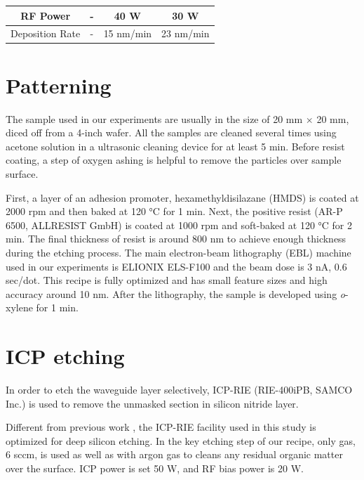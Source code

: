 \begin{table}
\begin{tabular}{cccc}
RF Power      & -                                 & 40 W                                                                                     & 30 W                                                                                     \\ \hline
Deposition Rate          & -                                 & 15 nm/min                                                                               & 23 nm/min                                                                               \\ \hline
\end{tabular}
\end{table}




\section{Patterning}
The sample used in our experiments are usually in the size of 20 mm $\times$ 20 mm, diced off from a 4-inch wafer. 
All the samples are cleaned several times using acetone solution in a ultrasonic cleaning device for at least 5 min.
Before resist coating, a step of oxygen ashing is helpful to remove the particles over sample surface.

First, a layer of an adhesion promoter, hexamethyldisilazane (HMDS) is coated at 2000 rpm and then baked at 120 \si{\celsius} for 1 min. Next, the positive resist (AR-P 6500, ALLRESIST GmbH) is coated at 1000 rpm and soft-baked at 120 \si{\celsius} for 2 min. The final thickness of resist is around 800 nm to achieve enough thickness during the etching process. The main electron-beam lithography (EBL) machine used in our experiments is ELIONIX ELS-F100 and the beam dose is 3 nA, 0.6 sec/dot. This recipe is fully optimized and has small feature sizes and high accuracy around 10 nm. After the lithography, the sample is developed using \textit{o}-xylene for 1 min. 


\section{ICP etching}

In order to etch the waveguide layer selectively, ICP-RIE (RIE-400iPB, SAMCO Inc.) is used to remove the unmasked section in silicon nitride layer.

Different from previous work \cite{Yusuke2017}, the ICP-RIE facility used in this study is optimized for deep silicon etching. In the key etching step of our recipe, only  gas, 6 sccm, is used as well as with argon gas to cleans any residual organic matter over the surface. ICP power is set 50 W, and RF bias power is 20 W.

